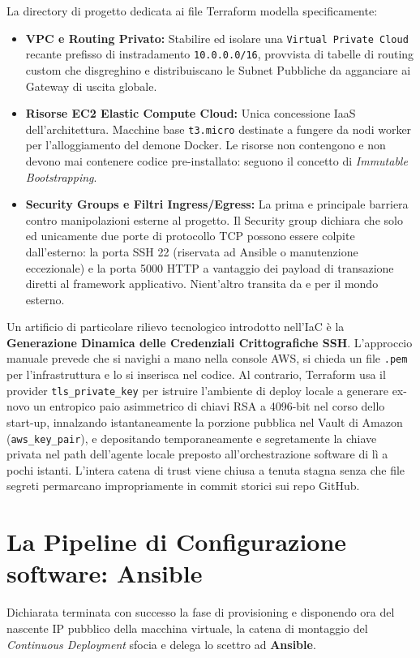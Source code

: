 \documentclass[11pt,a4paper]{report}
\begin{document}
La directory di progetto dedicata ai file Terraform modella specificamente:
\begin{itemize}
    \item \textbf{VPC e Routing Privato:} Stabilire ed isolare una \texttt{Virtual Private Cloud} recante prefisso di instradamento \texttt{10.0.0.0/16}, provvista di tabelle di routing custom che disgreghino e distribuiscano le Subnet Pubbliche da agganciare ai Gateway di uscita globale.
    \item \textbf{Risorse EC2 Elastic Compute Cloud:} Unica concessione IaaS dell'architettura. Macchine base \texttt{t3.micro} destinate a fungere da nodi worker per l'alloggiamento del demone Docker. Le risorse non contengono e non devono mai contenere codice pre-installato: seguono il concetto di \textit{Immutable Bootstrapping}.
    \item \textbf{Security Groups e Filtri Ingress/Egress:} La prima e principale barriera contro manipolazioni esterne al progetto. Il Security group dichiara che solo ed unicamente due porte di protocollo TCP possono essere colpite dall'esterno: la porta SSH 22 (riservata ad Ansible o manutenzione eccezionale) e la porta 5000 HTTP a vantaggio dei payload di transazione diretti al framework applicativo. Nient'altro transita da e per il mondo esterno.
\end{itemize}

Un artificio di particolare rilievo tecnologico introdotto nell'IaC \`e la \textbf{Generazione Dinamica delle Credenziali Crittografiche SSH}.
L'approccio manuale prevede che si navighi a mano nella console AWS, si chieda un file \texttt{.pem} per l'infrastruttura e lo si inserisca nel codice. Al contrario, Terraform usa il provider \texttt{tls\_private\_key} per istruire l'ambiente di deploy locale a generare ex-novo un entropico paio asimmetrico di chiavi RSA a 4096-bit nel corso dello start-up, innalzando istantaneamente la porzione pubblica nel Vault di Amazon (\texttt{aws\_key\_pair}), e depositando temporaneamente e segretamente la chiave privata nel path dell'agente locale preposto all'orchestrazione software di l\`i a pochi istanti. L'intera catena di trust viene chiusa a tenuta stagna senza che file segreti permarcano impropriamente in commit storici sui repo GitHub.

\section{La Pipeline di Configurazione software: Ansible}
Dichiarata terminata con successo la fase di provisioning e disponendo ora del nascente IP pubblico della macchina virtuale, la catena di montaggio del \textit{Continuous Deployment} sfocia e delega lo scettro ad \textbf{Ansible}.
\end{document}
